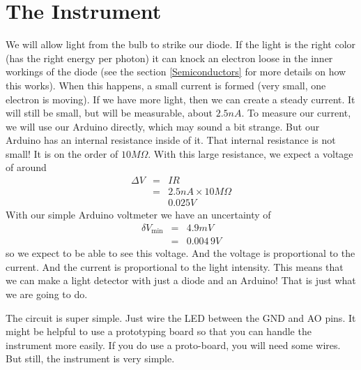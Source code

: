 \section{The Instrument}

We will allow light from the bulb to strike our diode. If the light is the
right color (has the right energy per photon) it can knock an electron loose
in the inner workings of the diode (see the section \ref{Semiconductors} for
more details on how this works). When this happens, a small current is
formed (very small, one electron is moving). If we have more light, then we
can create a steady current. It will still be small, but will be measurable,
about $2.5\unit{nA}$. To measure our current, we will use our Arduino
directly, which may sound a bit strange. But our Arduino has an internal
resistance inside of it. That internal resistance is not small! It is on the
order of $10\unit{M%
	\Omega%
}.$ With this large resistance, we expect a voltage of around 
\begin{eqnarray*}
	\Delta V &=&IR \\
	&=&2.5\unit{nA}\times 10\unit{M%
		\Omega%
	} \\
	&&0.025\unit{V}
\end{eqnarray*}%
With our simple Arduino voltmeter we have an uncertainty of 
\begin{eqnarray*}
	\delta V_{\min } &=&4.9\unit{mV} \\
	&=&0.004\,9\unit{V}
\end{eqnarray*}%
so we expect to be able to see this voltage. And the voltage is proportional
to the current. And the current is proportional to the light intensity. This
means that we can make a light detector with just a diode and an Arduino!
That is just what we are going to do.

The circuit is super simple. Just wire the LED between the GND and AO pins.
It might be helpful to use a prototyping board so that you can handle the
instrument more easily. If you do use a proto-board, you will need some
wires. But still, the instrument is very simple.


